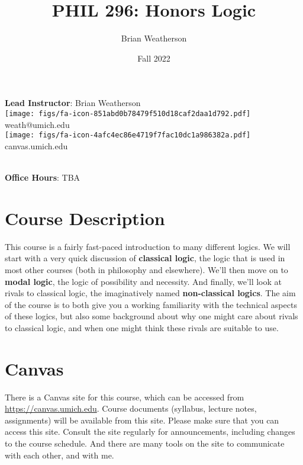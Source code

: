 \documentclass[
]{article}
\title{PHIL 296: Honors Logic}
\author{Brian Weatherson}
\date{Fall 2022}
\begin{document}
\maketitle
\ifdefined\Shaded\renewenvironment{Shaded}{\begin{tcolorbox}[frame hidden, breakable, interior hidden, enhanced, borderline west={3pt}{0pt}{shadecolor}, sharp corners, boxrule=0pt]}{\end{tcolorbox}}\fi

\textbf{Lead Instructor}: Brian Weatherson\\
\texttt{[image: figs/fa-icon-851abd0b78479f510d18caf2daa1d792.pdf]}
weath@umich.edu\\
\texttt{[image: figs/fa-icon-4afc4ec86e4719f7fac10dc1a986382a.pdf]}
canvas.umich.edu\\
\strut \\
\textbf{Office Hours}: TBA\\

\hypertarget{course-description}{%
\section{Course Description}\label{course-description}}

This course is a fairly fast-paced introduction to many different
logics. We will start with a very quick discussion of \textbf{classical
logic}, the logic that is used in most other courses (both in philosophy
and elsewhere). We'll then move on to \textbf{modal logic}, the logic of
possibility and necessity. And finally, we'll look at rivals to
classical logic, the imaginatively named \textbf{non-classical logics}.
The aim of the course is to both give you a working familiarity with the
technical aspects of these logics, but also some background about why
one might care about rivals to classical logic, and when one might think
these rivals are suitable to use.

\hypertarget{canvas}{%
\section{Canvas}\label{canvas}}

There is a Canvas site for this course, which can be accessed from
\url{https://canvas.umich.edu}. Course documents (syllabus, lecture
notes, assignments) will be available from this site. Please make sure
that you can access this site. Consult the site regularly for
announcements, including changes to the course schedule. And there are
many tools on the site to communicate with each other, and with me.
\end{document}

